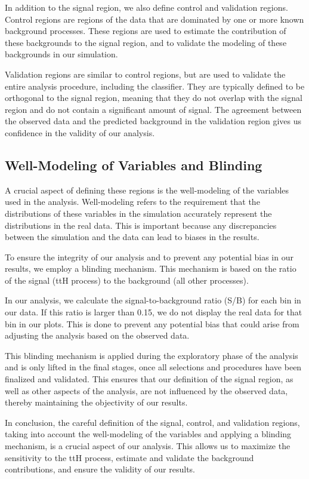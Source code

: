 In addition to the signal region, we also define control and validation regions. Control regions are regions of the data
that are dominated by one or more known background processes. These regions are used to estimate the contribution of
these backgrounds to the signal region, and to validate the modeling of these backgrounds in our simulation.

Validation regions are similar to control regions, but are used to validate the entire analysis procedure, including the
classifier. They are typically defined to be orthogonal to the signal region, meaning that they do not overlap with the
signal region and do not contain a significant amount of signal. The agreement between the observed data and the
predicted background in the validation region gives us confidence in the validity of our analysis.

\subsection{Well-Modeling of Variables and Blinding}

A crucial aspect of defining these regions is the well-modeling of the variables used in the analysis. Well-modeling
refers to the requirement that the distributions of these variables in the simulation accurately represent the
distributions in the real data. This is important because any discrepancies between the simulation and the data can lead
to biases in the results.

To ensure the integrity of our analysis and to prevent any potential bias in our results, we employ a blinding
mechanism. This mechanism is based on the ratio of the signal (ttH process) to the background (all other processes).

In our analysis, we calculate the signal-to-background ratio (S/B) for each bin in our data. If this ratio is larger
than 0.15, we do not display the real data for that bin in our plots. This is done to prevent any potential bias that
could arise from adjusting the analysis based on the observed data.

This blinding mechanism is applied during the exploratory phase of the analysis and is only lifted in the final stages,
once all selections and procedures have been finalized and validated. This ensures that our definition of the signal
region, as well as other aspects of the analysis, are not influenced by the observed data, thereby maintaining the
objectivity of our results.

In conclusion, the careful definition of the signal, control, and validation regions, taking into account the
well-modeling of the variables and applying a blinding mechanism, is a crucial aspect of our analysis. This allows us to
maximize the sensitivity to the ttH process, estimate and validate the background contributions, and ensure the validity
of our results.